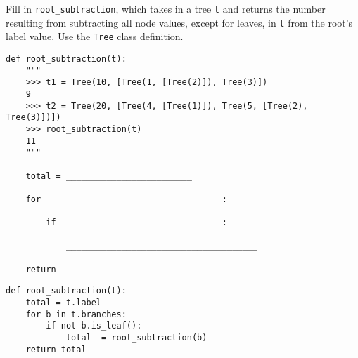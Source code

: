 \question
Fill in \lstinline{root_subtraction}, which takes in a tree \lstinline{t} and returns the number resulting from subtracting all node values, except for leaves, in \lstinline{t} from the root's label value. Use the \lstinline{Tree} class definition.

\begin{lstlisting}
def root_subtraction(t):
    """
    >>> t1 = Tree(10, [Tree(1, [Tree(2)]), Tree(3)])
    9
    >>> t2 = Tree(20, [Tree(4, [Tree(1)]), Tree(5, [Tree(2), Tree(3)])])
    >>> root_subtraction(t)
    11
    """

    total = _________________________

    for ___________________________________:

        if ________________________________:

            ______________________________________

    return ___________________________
\end{lstlisting}

\begin{solution}
\begin{lstlisting}
def root_subtraction(t):
    total = t.label
    for b in t.branches:
        if not b.is_leaf():
            total -= root_subtraction(b)
    return total
\end{lstlisting}
\end{solution}